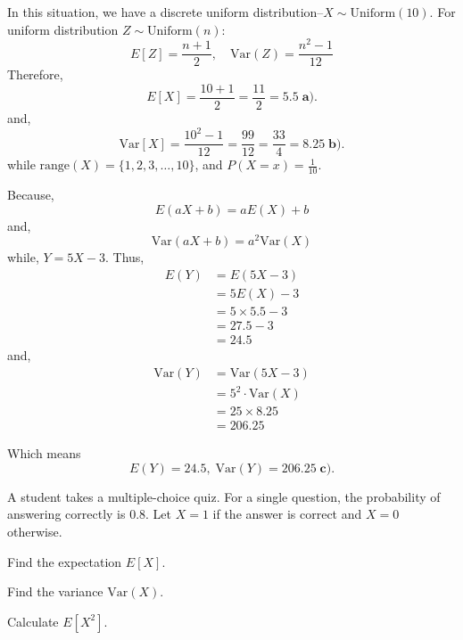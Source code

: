 \documentclass[a4paper, 10pt]{article}
\begin{document}
\begin{solution}
In this situation, we have a discrete uniform distribution--\( X \sim \text{Uniform}(10) \).
For uniform distribution \( Z \sim \text{Uniform}(n) \):
\[
    E[Z] = \frac{n + 1}{2}, \quad \text{Var}(Z) = \frac{n^2 - 1}{12}
\]
Therefore,
\[
    E[X] = \frac{10 + 1}{2} = \frac{11}{2} = \boxed{5.5} \; \textbf{a).}
\]
and,
\[
    \text{Var}[X] = \frac{10^2 - 1}{12} = \frac{99}{12} = \frac{33}{4} = \boxed{8.25} \; \textbf{b).}
\]
while \( \text{range}(X) = \{1, 2, 3, \dots, 10\} \), and \( P(X = x) = \frac{1}{10} \).

\vspace{2mm}

Because,
\[
    E(aX + b) = aE(X) + b
\]
and,
\[
    \text{Var}(aX + b) = a^2 \text{Var}(X)
\]
while, \( Y = 5X - 3 \). Thus,
\begin{align*}
    E(Y) &= E(5X - 3) \\
    &= 5E(X) - 3 \\
    &= 5 \times 5.5 - 3 \\
    &= 27.5 - 3 \\
    &= 24.5
\end{align*}
and,
\begin{align*}
    \text{Var}(Y) &= \text{Var}(5X - 3) \\
    &= 5^2 \cdot \text{Var}(X) \\
    &= 25 \times 8.25 \\
    &= 206.25
\end{align*}

Which means
\[\boxed{
    E(Y) = 24.5, \; \text{Var}(Y) = 206.25
} \; \textbf{c).} \]
\end{solution}


\begin{problem}
A student takes a multiple-choice quiz. For a single question, the probability of answering correctly is 0.8.
Let \( X = 1 \) if the answer is correct and \( X = 0 \) otherwise.
\begin{subproblems}
    \item Find the expectation \( E[X] \).
    \item Find the variance \( \text{Var}(X) \).
    \item Calculate \( E[X^2] \).
\end{subproblems}
\end{problem}
\end{document}
